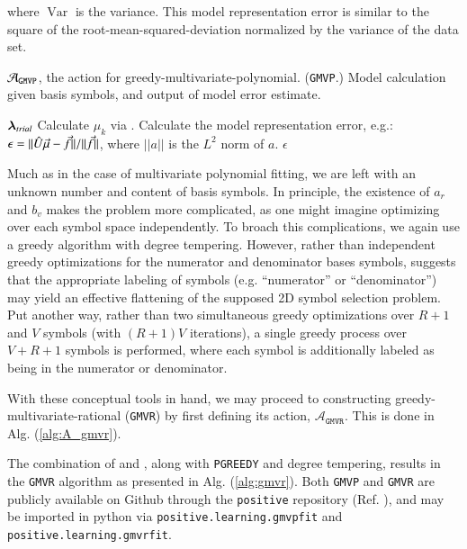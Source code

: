 \documentclass[twocolumn,aps,prd,floatfix,preprintnumbers,a4paper,nofootinbib,
superscriptaddress,10pt]{revtex4-1}
\def\gmvp#1{greedy-multivariate-polynomial#1
  (\texttt{GMVP}#1)\gdef\gmvp{\texttt{GMVP}}}
\def\gmvr#1{greedy-multivariate-rational#1
  (\texttt{GMVR}#1)\gdef\gmvr{\texttt{GMVR}}}
\def\pgreedy{\texttt{PGREEDY}}
\begin{document}
%
where $\operatorname{Var}$ is the variance. This model representation error is similar to the square of the root-mean-squared-deviation normalized by the variance of the data set.
{\scriptsize
\begin{algorithm}[H]
  \caption{$\mathcal{A}_{\gmvp}$, the action for \gmvp. Model calculation given basis symbols, and output of model error estimate.}
  \label{alg:A_gmvp}
  \begin{algorithmic}[1]
     ${\bm{\lambda}}_{trial}$
    \vskip 10pt
    \State Calculate $\mu_k$ via .
    \State Calculate the model representation error, e.g.: $\epsilon = ||\hat{U} \vec{\mu} - \vec{f}||/||\vec{f}||$, where $||a||$ is the $L^2$ norm of $a$.
    \vskip 10pt
     $\epsilon$
  \end{algorithmic}
\end{algorithm}
}
%
\par Much as in the case of multivariate polynomial fitting, we are left with an unknown number and content of basis symbols.
%
In principle, the existence of $a_r$ and $b_v$ makes the problem more complicated, as one might imagine optimizing over each symbol space independently.
%
To broach this complications, we again use a greedy algorithm with degree tempering.
%
However, rather than independent greedy optimizations for the numerator and denominator bases symbols,  suggests that the appropriate labeling of symbols (e.g. ``numerator'' or ``denominator'') may yield an effective flattening of the supposed 2D symbol selection problem.
%
Put another way, rather than two simultaneous greedy optimizations over $R+1$ and $V$ symbols (with $(R+1)V$ iterations), a single greedy process over $V+R+1$ symbols is performed, where each symbol is additionally labeled as being in the numerator or denominator.
%
\par With these conceptual tools in hand, we may proceed to constructing \gmvr{} by first defining its action, $\mathcal{A}_{\gmvr}$.
%
This is done in Alg. (\ref{alg:A_gmvr}).
%
\par The combination of  and , along with \pgreedy{} and degree tempering, results in the \gmvr{} algorithm as presented in Alg. (\ref{alg:gmvr}).
%
%
Both \gmvp{} and \gmvr{} are publicly available on Github through the \texttt{positive} repository (Ref. \cite{lionel_london_2018_1402516}), and may be imported in python via {\small{\texttt{positive.learning.gmvpfit}}} and {\small{\texttt{positive.learning.gmvrfit}}}.
%
%
\end{document}
